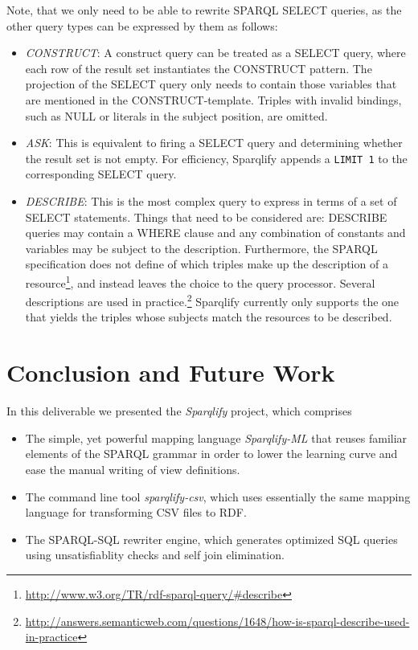 \documentclass[a4paper,twoside,bibtotoc,abstracton,12pt,BCOR=15mm]{scrreprt}
\begin{document}
Note, that we only need to be able to rewrite SPARQL SELECT queries, as the other query types can be expressed by  them as follows:

\begin{itemize}
\item \emph{CONSTRUCT}: A construct query can be treated as a SELECT query, where each row of the result set instantiates the CONSTRUCT pattern.
	The projection of the SELECT query only needs to contain those variables that are mentioned in the CONSTRUCT-template.
	Triples with invalid bindings, such as NULL or literals in the subject position, are omitted.
\item \emph{ASK}: This is equivalent to firing a SELECT query and determining whether the result set is not empty. 
	For efficiency, Sparqlify appends a \texttt{LIMIT 1} to the corresponding SELECT query. 
\item \emph{DESCRIBE}: This is the most complex query to express in terms of a set of SELECT statements. 
	Things that need to be considered are: DESCRIBE queries may contain a WHERE clause and any combination of constants and variables may be subject to the description.
	Furthermore, the SPARQL specification does not define of which triples make up the description of a resource\footnote{\url{http://www.w3.org/TR/rdf-sparql-query/\#describe}},
	and instead leaves the choice to the query processor.
	Several descriptions are used in practice.\footnote{\url{http://answers.semanticweb.com/questions/1648/how-is-sparql-describe-used-in-practice}}
	Sparqlify currently only supports the one that yields the triples whose subjects match the resources to be described.    
\end{itemize}


\section{Conclusion and Future Work}
In this deliverable we presented the \emph{Sparqlify} project, which comprises
\begin{itemize}
  \item The simple, yet powerful mapping language \emph{Sparqlify-ML} that reuses familiar elements of the SPARQL grammar
  in order to lower the learning curve and ease the manual writing of view definitions.
  \item The command line tool \emph{sparqlify-csv}, which uses essentially the same mapping language for transforming CSV files to RDF. 
  \item The SPARQL-SQL rewriter engine, which generates optimized SQL queries using unsatisfiablity checks and self join elimination.   
\end{itemize}
\end{document}
